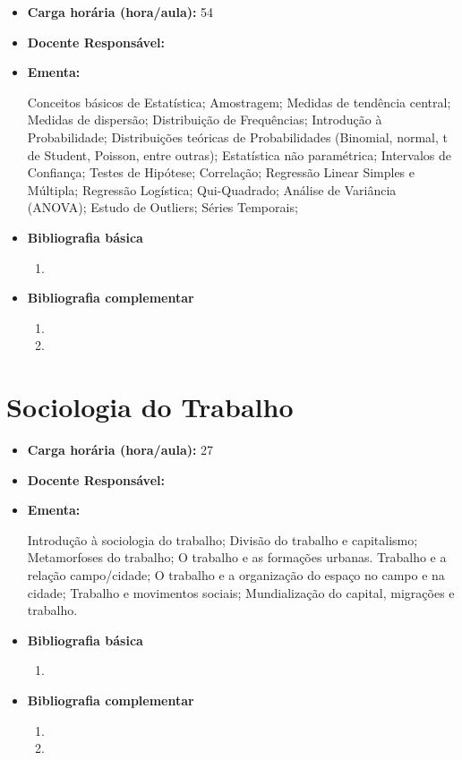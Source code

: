 \documentclass[11pt,fleqn]{book} %
\begin{document}
\begin{itemize}
	\item \textbf{Carga horária (hora/aula):} 54
	\item \textbf{Docente Responsável:}~
	\item \textbf{Ementa:} 

	Conceitos básicos de Estatística;
	Amostragem;
	Medidas de tendência central;
	Medidas de dispersão;
	Distribuição de Frequências;
	Introdução à Probabilidade;
	Distribuições teóricas de Probabilidades (Binomial, normal, t de Student, Poisson, entre outras);
	Estatística não paramétrica;
	Intervalos de Confiança;
	Testes de Hipótese;
    Correlação; 
    Regressão Linear Simples e Múltipla;
    Regressão Logística;
    Qui-Quadrado;
    Análise de Variância (ANOVA);
    Estudo de Outliers;
	Séries Temporais;
	
	\item \textbf{Bibliografia básica}
	\begin{enumerate}
		\item 
	\end{enumerate}
	\item \textbf{Bibliografia complementar}
	\begin{enumerate}
		\item
		\item 
	\end{enumerate}
\end{itemize}


\newpage
\section{Sociologia do Trabalho}\label{disc:soctrab}

\begin{itemize}
	\item \textbf{Carga horária (hora/aula):} 27
	\item \textbf{Docente Responsável:}~
	\item \textbf{Ementa:} 
	
	Introdução à sociologia do trabalho;
	Divisão do trabalho e capitalismo;
	Metamorfoses do trabalho;
	O trabalho e as formações urbanas.
	Trabalho e a relação campo/cidade;
	O trabalho e a organização do espaço no campo e na cidade;
	Trabalho e movimentos sociais;
	Mundialização do capital, migrações e trabalho.
	
	\item \textbf{Bibliografia básica}
	\begin{enumerate}
		\item 
	\end{enumerate}
	\item \textbf{Bibliografia complementar}
	\begin{enumerate}
		\item
		\item 
	\end{enumerate}
\end{itemize}
\end{document}
